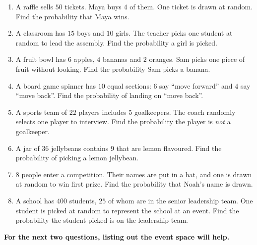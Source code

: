 \documentclass[11pt]{article}
\newcommand{\ans}{\hrulefill}
\newcommand{\anshere}{\par\vspace{0.4em}\noindent\ans\par\vspace{0.4em}}
\begin{document}
\begin{enumerate}[label=(\alph*)]
  \item A raffle sells $50$ tickets. Maya buys $4$ of them. One ticket is drawn at random. Find
    the probability that Maya wins.
  \anshere
  \item A classroom has $15$ boys and $10$ girls. The teacher picks one student at random to
    lead the assembly. Find the probability a girl is picked.
  \anshere
  \item A fruit bowl has $6$ apples, $4$ bananas and $2$ oranges. Sam picks one piece of fruit
    without looking. Find the probability Sam picks a banana.
  \anshere
  \item A board game spinner has $10$ equal sections: $6$ say ``move forward'' and $4$ say
    ``move back''. Find the probability of landing on ``move back''.
  \anshere
  \item A sports team of $22$ players includes $5$ goalkeepers. The coach randomly selects one
    player to interview. Find the probability the player is \emph{not} a goalkeeper.
  \anshere
  \item A jar of $36$ jellybeans contains $9$ that are lemon flavoured. Find the probability of
    picking a lemon jellybean.
  \anshere
  \item $8$ people enter a competition. Their names are put in a hat, and one is drawn at random
    to win first prize. Find the probability that Noah's name is drawn.
  \anshere
  \item A school has $400$ students, $25$ of whom are in the senior leadership team. One student
    is picked at random to represent the school at an event. Find the probability the student
    picked is on the leadership team.
  \anshere
\end{enumerate}

\vspace{0.3em}
\noindent\textbf{For the next two questions, listing out the event space will help.}
\end{document}
